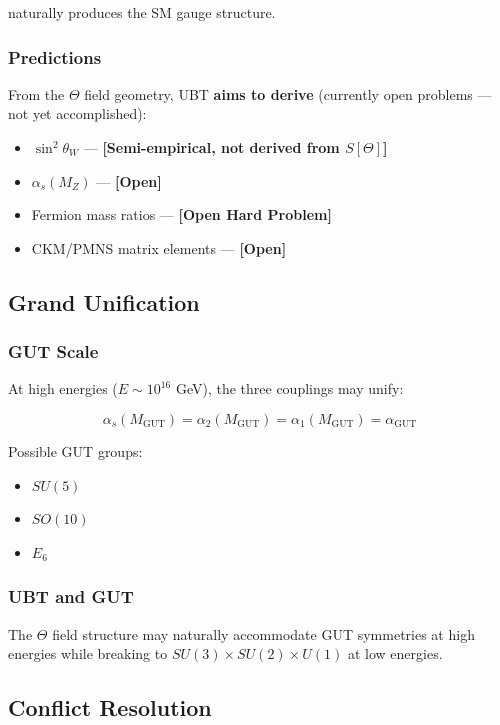 naturally produces the SM gauge structure.

\subsubsection{Predictions}

From the $\Theta$ field geometry, UBT \textbf{aims to derive}
(currently open problems — not yet accomplished):
\begin{itemize}
    \item $\sin^2\theta_W$ — \textbf{[Semi-empirical, not derived from $S[\Theta]$]}
    \item $\alpha_s(M_Z)$ — \textbf{[Open]}
    \item Fermion mass ratios — \textbf{[Open Hard Problem]}
    \item CKM/PMNS matrix elements — \textbf{[Open]}
\end{itemize}

\subsection{Grand Unification}

\subsubsection{GUT Scale}

At high energies ($E \sim 10^{16}$ GeV), the three couplings may unify:

\begin{equation}
\alpha_s(M_{\text{GUT}}) = \alpha_2(M_{\text{GUT}}) = \alpha_1(M_{\text{GUT}}) = \alpha_{\text{GUT}}
\end{equation}

Possible GUT groups:
\begin{itemize}
    \item $SU(5)$
    \item $SO(10)$
    \item $E_6$
\end{itemize}

\subsubsection{UBT and GUT}

The $\Theta$ field structure may naturally accommodate GUT symmetries at high energies while breaking to $SU(3) \times SU(2) \times U(1)$ at low energies.

\subsection{Conflict Resolution}

